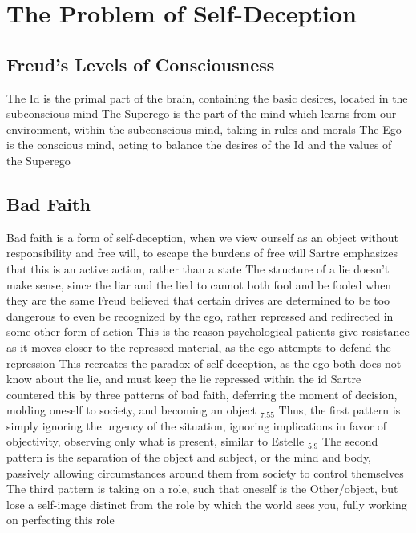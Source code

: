 \documentclass[11 pt, twoside]{article}
\newenvironment{outline*}
{
	\begin{outline}[enumerate]
	}
	{\end{outline}
}
\newcommand{\footb}[2]{\hyperlink{#1}{$_{#1.#2}$}}
\begin{document}
\section{The Problem of Self-Deception}
\subsection{Freud's Levels of Consciousness}
\begin{outline*}
\1 The Id is the primal part of the brain, containing the basic desires, located in the subconscious mind
\1 The Superego is the part of the mind which learns from our environment, within the subconscious mind, taking in rules and morals
\1 The Ego is the conscious mind, acting to balance the desires of the Id and the values of the Superego
\end{outline*}
\subsection{Bad Faith}
\begin{outline*}
\1 Bad faith is a form of self-deception, when we view ourself as an object without responsibility and free will, to escape the burdens of free will
\2 Sartre emphasizes that this is an active action, rather than a state
\1 The structure of a lie doesn't make sense, since the liar and the lied to cannot both fool and be fooled when they are the same
\1 Freud believed that certain drives are determined to be too dangerous to even be recognized by the ego, rather repressed and redirected in some other form of action
\2 This is the reason psychological patients give resistance as it moves closer to the repressed material, as the ego attempts to defend the repression
\2 This recreates the paradox of self-deception, as the ego both does not know about the lie, and must keep the lie repressed within the id
\1 Sartre countered this by three patterns of bad faith, deferring the moment of decision, molding oneself to society, and becoming an object \footb{7}{55}
\2 Thus, the first pattern is simply ignoring the urgency of the situation, ignoring implications in favor of objectivity, observing only what is present, similar to Estelle \footb{5}{9}
\2 The second pattern is the separation of the object and subject, or the mind and body, passively allowing circumstances around them from society to control themselves
\2 The third pattern is taking on a role, such that oneself is the Other/object, but lose a self-image distinct from the role by which the world sees you, fully working on perfecting this role
\end{outline*}
\end{document}
